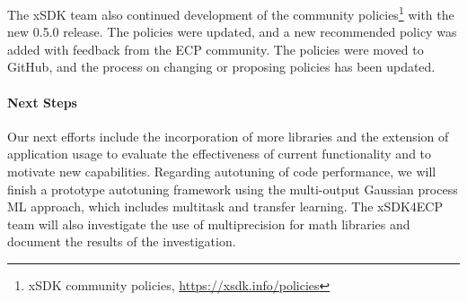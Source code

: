 The xSDK team also continued development of the community policies\footnote{xSDK community policies, \url{https://xsdk.info/policies}}
with the new 0.5.0 release.
The policies were updated, and a new recommended policy was added with feedback from the ECP community. The policies were moved to GitHub, and the process on changing or proposing policies has been updated.

\paragraph{Next Steps}

Our next efforts include the incorporation of more libraries and the extension of application usage to evaluate the effectiveness of current functionality and to motivate new capabilities. Regarding autotuning of code performance, we will finish a prototype autotuning framework using the multi-output Gaussian process ML approach, which includes multitask and transfer learning. The xSDK4ECP team will also investigate the use of multiprecision for math libraries and document the results of the investigation.

